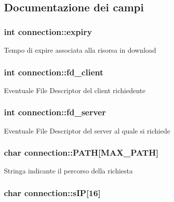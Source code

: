 \subsection{Documentazione dei campi}
\hypertarget{structconnection_a8336ba2f653330fe728b52edd7d6d2b3}{
\subsubsection[{expiry}]{\setlength{\rightskip}{0pt plus 5cm}int {\bf connection::expiry}}}
\label{structconnection_a8336ba2f653330fe728b52edd7d6d2b3}
Tempo di expire associata alla risorsa in download \hypertarget{structconnection_a5bb81a57f0db72ea26bfa85b3ead6653}{
\subsubsection[{fd\_\-client}]{\setlength{\rightskip}{0pt plus 5cm}int {\bf connection::fd\_\-client}}}
\label{structconnection_a5bb81a57f0db72ea26bfa85b3ead6653}
Eventuale File Descriptor del client richiedente \hypertarget{structconnection_a2906fb676dd78cf78ff63f6ac1c7f1d0}{
\subsubsection[{fd\_\-server}]{\setlength{\rightskip}{0pt plus 5cm}int {\bf connection::fd\_\-server}}}
\label{structconnection_a2906fb676dd78cf78ff63f6ac1c7f1d0}
Eventuale File Descriptor del server al quale si richiede \hypertarget{structconnection_abe305d592cdaa7b373988774c0eebfe0}{
\subsubsection[{PATH}]{\setlength{\rightskip}{0pt plus 5cm}char {\bf connection::PATH}\mbox{[}MAX\_\-PATH\mbox{]}}}
\label{structconnection_abe305d592cdaa7b373988774c0eebfe0}
Stringa indicante il percorso della richiesta \hypertarget{structconnection_a3939675d1ec7045c864a2df3bf5f8e7e}{
\subsubsection[{sIP}]{\setlength{\rightskip}{0pt plus 5cm}char {\bf connection::sIP}\mbox{[}16\mbox{]}}}
